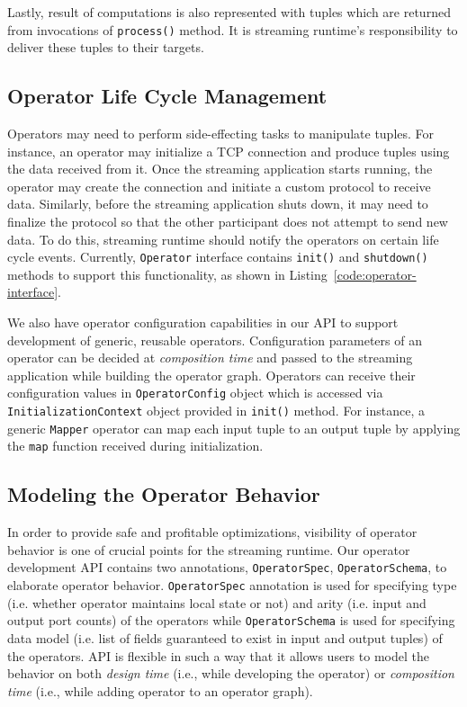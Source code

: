 Lastly, result of computations is also represented with tuples which are returned from invocations of \texttt{process()} method. It is streaming runtime's responsibility to deliver these tuples to their targets.

\subsection{Operator Life Cycle Management}\label{sec:operator-lifecycle}

Operators may need to perform side-effecting tasks to manipulate tuples. For instance, an operator may initialize a TCP connection and produce tuples using the data received from it. Once the streaming application starts running, the operator may create the connection and initiate a custom protocol to receive data. Similarly, before the streaming application shuts down, it may need to finalize the protocol so that the other participant does not attempt to send new data. To do this, streaming runtime should notify the operators on certain life cycle events. Currently, \texttt{Operator} interface contains \texttt{init()} and \texttt{shutdown()} methods to support this functionality, as shown in Listing~\ref{code:operator-interface}. 

We also have operator configuration capabilities in our API to support development of generic, reusable operators. Configuration parameters of an operator can be decided at \textit{composition time} and passed to the streaming application while building the operator graph. Operators can receive their configuration values in \texttt{OperatorConfig} object which is accessed via \texttt{InitializationContext} object provided in \texttt{init()} method. For instance, a generic \texttt{Mapper} operator can map each input tuple to an output tuple by applying the \texttt{map} function received during initialization.

\subsection{Modeling the Operator Behavior}\label{sec:operator-behavior}

In order to provide safe and profitable optimizations, visibility of operator behavior is one of crucial points for the streaming runtime. Our operator development API contains two annotations, \texttt{OperatorSpec}, \texttt{OperatorSchema}, to elaborate operator behavior. \texttt{OperatorSpec} annotation is used for specifying type (i.e. whether operator maintains local state or not) and arity (i.e. input and output port counts) of the operators while \texttt{OperatorSchema} is used for specifying data model (i.e. list of fields guaranteed to exist in input and output tuples) of the operators. API is flexible in such a way that it allows users to model the behavior on both \textit{design time} (i.e., while developing the operator) or \textit{composition time} (i.e., while adding operator to an operator graph). 


